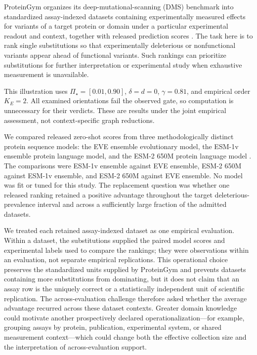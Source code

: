 \documentclass[11pt]{article}
\newcommand{\PSet}{\Pi_\star}
\theoremstyle{remark}
\begin{document}
ProteinGym organizes its deep-mutational-scanning (DMS) benchmark into
standardized assay-indexed datasets containing experimentally measured effects
for variants of a target protein or domain under a particular experimental
readout and context, together with released prediction scores
\cite{notin2023proteingym}. The task here is to rank single substitutions so
that experimentally deleterious or nonfunctional variants appear ahead of
functional variants. Such rankings can prioritize substitutions for further
interpretation or experimental study when exhaustive measurement is
unavailable.

This illustration uses $\PSet=[0.01,0.90]$, $\delta=d=0$,
$\gamma=0.81$, and empirical order $K_E=2$. All examined orientations fail
the observed gate, so computation is unnecessary for their verdicts. These
are results under the joint empirical assessment, not context-specific graph
reductions.

We compared released zero-shot scores from three methodologically distinct
protein sequence models: the EVE ensemble evolutionary model, the ESM-1v
ensemble protein language model, and the ESM-2 650M protein language model
\cite{frazer2021eve,meier2021esm1v,lin2023esm2}. The comparisons were ESM-1v
ensemble against EVE ensemble, ESM-2 650M against ESM-1v ensemble, and ESM-2
650M against EVE ensemble. No model was fit or tuned for this study. The
replacement question was whether one released ranking retained a positive
advantage throughout the target deleterious-prevalence interval and across a
sufficiently large fraction of the admitted datasets.

We treated each retained assay-indexed dataset as one empirical evaluation.
Within a dataset, the substitutions supplied the paired model scores and
experimental labels used to compare the rankings; they were observations
within an evaluation, not separate empirical replications. This operational
choice preserves the standardized units supplied by ProteinGym and prevents
datasets containing more substitutions from dominating, but it does not claim
that an assay row is the uniquely correct or a statistically independent unit
of scientific replication. The across-evaluation challenge therefore asked
whether the average advantage recurred across these dataset contexts. Greater
domain knowledge could motivate another prospectively declared
operationalization---for example, grouping assays by protein, publication,
experimental system, or shared measurement context---which could change both
the effective collection size and the interpretation of across-evaluation
support.
\end{document}
